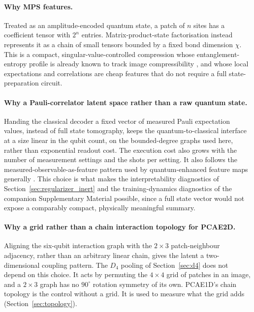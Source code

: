 \documentclass[pdflatex,sn-basic]{sn-jnl}
\begin{document}
\paragraph{Why MPS features.}
Treated as an amplitude-encoded quantum state, a patch of $n$ sites has a
coefficient tensor with $2^{n}$ entries. Matrix-product-state factorisation
instead represents it as a chain of small tensors bounded by a fixed bond
dimension $\chi$. This is a compact, singular-value-controlled compression whose
entanglement-entropy profile is already known to track image compressibility
\citep{Latorre2005, Stoudenmire2016}, and whose local expectations and
correlations are cheap features that do not require a full
state-preparation circuit.


\paragraph{Why a Pauli-correlator latent space rather than a raw quantum state.}
Handing the classical decoder a fixed vector of measured Pauli expectation
values, instead of full state tomography, keeps the quantum-to-classical
interface at a size linear in the qubit count, on
the bounded-degree graphs used here, rather than exponential readout cost.
The execution cost also grows with the number of measurement settings and
the shots per setting. It also
follows the measured-observable-as-feature pattern used by quantum-enhanced
feature maps generally \citep{Havlicek2019}. This choice is what makes the
interpretability diagnostics of Section~\ref{sec:regularizer_inert} and the
training-dynamics diagnostics of the companion Supplementary Material possible,
since a full state vector would not expose a comparably compact, physically
meaningful summary.



\paragraph{Why a grid rather than a chain interaction topology for PCAE2D.}
Aligning the six-qubit interaction graph with the $2\times3$ patch-neighbour
adjacency, rather than an arbitrary linear chain, gives the latent a two-dimensional coupling
pattern. The $D_4$ pooling of Section~\ref{sec:d4} does not depend on this
choice. It acts by permuting the $4\times4$ grid of patches in an image, and a
$2\times3$ graph has no $90^\circ$ rotation symmetry of its own.
PCAE1D's chain topology is the control without
a grid. It is used to measure what the grid adds (Section~\ref{sec:topology}).
\end{document}
